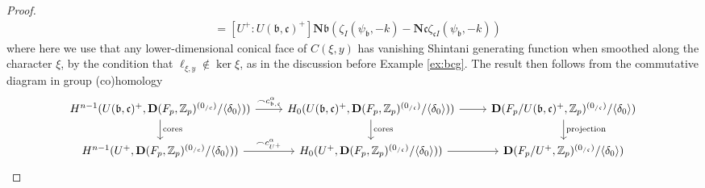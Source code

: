 \documentclass[10pt]{amsart}
\theoremstyle{definition}
\newcommand{\Z}{\mathbb{Z}}
\renewcommand{\c}{\mathfrak{c}}
\renewcommand{\b}{\mathfrak{b}}
\newcommand{\D}{\mathbf{D}}
\numberwithin{equation}{section}
\begin{document}
\begin{proof}
\begin{align}
            &= [U^+:U(\b,\c)^+] \mathbf{N}\b(\zeta_I(\psi_\b, -k) - \mathbf{N}\c\zeta_{\c I}(\psi_\b, -k))
        \end{align}
        where here we use that any lower-dimensional conical face of $C(\xi, y)$ has vanishing Shintani generating function when smoothed along the character $\xi$, by the condition that $\ell_{\xi,y}\not\in \ker \xi$, as in the discussion before Example \ref{ex:bcg}. The result then follows from the commutative diagram in group (co)homology
        \begin{equation}
            \begin{tikzcd}
            H^{n-1}(U(\b,\c)^+, \D(F_p, \Z_p)^{(0_{/c})}/\langle \delta_0\rangle)) \arrow[d,"\mathrm{cores}"] \arrow[r,"\frown c_{\b,\c}^\alpha"] & H_0(U(\b,\c)^+, \D(F_p, \Z_p)^{(0_{/\c})}/\langle \delta_0\rangle)) \arrow[r] \arrow[d,"\mathrm{cores}"] & \D(F_p/U(\b,\c)^+, \Z_p)^{(0_{/\c})}/\langle \delta_0\rangle) \arrow[d,"\mathrm{projection}"] \\
            H^{n-1}(U^+, \D(F_p, \Z_p)^{(0_{/c})}/\langle \delta_0\rangle)) \arrow[r,"\frown c_{U^+}^\alpha"] & H_0(U^+, \D(F_p, \Z_p)^{(0_{/\c})}/\langle \delta_0\rangle)) \arrow[r] & \D(F_p/U^+, \Z_p)^{(0_{/\c})}/\langle \delta_0\rangle)
            \end{tikzcd}
        \end{equation}
        
    \end{proof}
    
\end{document}

